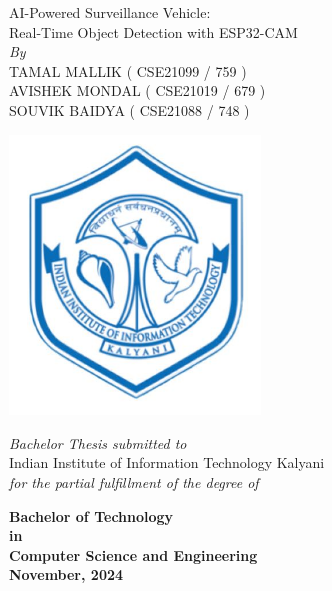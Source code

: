 \documentclass[12pt,a4paper]{report}
\newcommand{\mytitle}{AI-Powered Surveillance Vehicle:
Real-Time Object Detection with ESP32-CAM}
\newcommand{\mySpace}{0.5cm}
\newcommand{\mySpaceHalf}{0.5cm}
\begin{document}
\clearpage
	\begin{titlepage}

    \centering

{\Huge AI-Powered Surveillance Vehicle:\\[0.5cm]Real-Time Object Detection with ESP32-CAM \fontsize{24}{28.8}\selectfont 
{}\selectfont}\\
    
    
\vspace{\mySpace}
    \large \textit{By}\\
\vspace{\mySpace}
    {\Large TAMAL MALLIK ( CSE21099 / 759 ) \\
    \vspace{0.1cm}
    AVISHEK MONDAL ( CSE21019 / 679 ) \\
    \vspace{0.1cm}
    SOUVIK BAIDYA ( CSE21088  / 748 ) \\
    \fontsize{18}{22}\selectfont {}\selectfont
\vspace{\mySpace}}
    \begin{center}
        \includegraphics[width=0.5\textwidth]{iiitk_logo} %
    \end{center}
    {\Large \textit{Bachelor Thesis submitted to}\\
    \vspace{\mySpaceHalf}
    Indian Institute of Information Technology Kalyani \\ \vspace{\mySpaceHalf}
	 \textit{for the partial fulfillment of the degree of}\\ \vspace{\mySpaceHalf}

{\bfseries %
	 Bachelor of Technology \\ 
	 in \\
	 Computer Science and Engineering\\ \vspace{\mySpaceHalf}
	  November, 2024 \fontsize{18}{22}}\selectfont {}\selectfont}
    \vspace*{\fill}
\end{titlepage}
\end{document}
